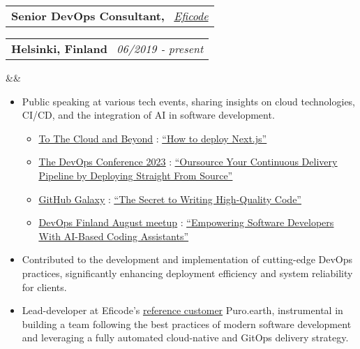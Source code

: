 \documentclass[11pt,a4paper,sans]{moderncv}
\makeatletter
\newcommand*{\customcventry}[7][.13em]{
\begin{tabular}{@{}l}
{\bfseries #4} \
{\itshape #3}
\end{tabular}
\hfill
\begin{tabular}{l@{}}
{\bfseries #5} \
{\itshape #2}
\end{tabular}
\ifx&#7&%
\else{\
\begin{minipage}{\maincolumnwidth}%
\small#7%
\end{minipage}}\fi%
\par\addvspace{#1}}
\newcommand{\inlineLink}[2]{%
    \underline{\href{#1}{#2}}%
}
\makeatother
\begin{document}
\customcventry{06/2019 ‐ present}
    {{\color{blue}\href{https://eficode.com}{Eficode}}}
    {Senior DevOps Consultant,}
    {Helsinki, Finland}
    {}{}
    {
        \begin{itemize}[leftmargin=0.6cm, label={\textbullet}]
            \item Public speaking at various tech events, sharing insights on cloud technologies, CI/CD, and the integration of AI in software development.
                \begin{itemize}
                    \item
                    \inlineLink{https://www.eficode.com/events/to-the-cloud-and-beyond}{To The Cloud and Beyond}:  \inlineLink{https://www.youtube.com/watch?v=vokeBcAZYaQ}{``How to deploy Next.js''}
                    
                    \item 
                    \inlineLink{https://www.thedevopsconference.com/videos?name=adriaan+knapen&topic=all&event=5}{The DevOps Conference 2023}: 
                    \inlineLink{https://www.youtube.com/watch?v=mdWIfox5O_E}{``Oursource Your Continuous Delivery Pipeline by Deploying Straight From Source''}
                    
                    \item
                    \inlineLink{https://galaxy.github.com/session/day-1-the-secret-to-writing-high-quality-code-more-efficiently}{GitHub Galaxy}: \inlineLink{https://galaxy.github.com/session/day-1-the-secret-to-writing-high-quality-code-more-efficiently}{``The Secret to Writing High-Quality Code''}
        
                        \item
                    \inlineLink{https://www.meetup.com/devops-finland/events/293742321/}{DevOps Finland August meetup}: 
                        \inlineLink{https://gh.aknapen.nl/20230823--ai-assisted-development--devops-finland-meetup}{``Empowering Software Developers With AI-Based Coding Assistants''}    
                \end{itemize}
                
            \item Contributed to the development and implementation of cutting-edge DevOps practices, significantly enhancing deployment efficiency and system reliability for clients.

            \item Lead-developer at Eficode's {\inlineLink{https://www.eficode.com/cases/puro.earth}{reference customer}} Puro.earth, instrumental in building a team following the best practices of modern software development and leveraging a fully automated cloud-native and GitOps delivery strategy.
        \end{itemize}
    }
\end{document}
